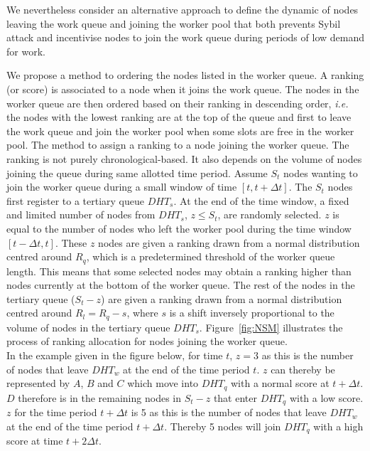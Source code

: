 \documentclass[a4paper, 12pt]{book}
\begin{document}
We nevertheless consider an alternative approach to define the dynamic of nodes leaving the work queue and joining the worker pool that both prevents Sybil attack and incentivise nodes to join the work queue during periods of low demand for work.

We propose a method to ordering the nodes listed in the worker queue. A ranking (or score) is associated to a node when it joins the work queue. The nodes in the worker queue are then ordered based on their ranking in descending order, \textit{i.e.} the nodes with the lowest ranking are at the top of the queue and first to leave the work queue and join the worker pool when some slots are free in the worker pool. The method to assign a ranking to a node joining the worker queue. 
The ranking is not purely chronological-based. It also depends on the volume of nodes joining the queue during same allotted time period. Assume $S_t$ nodes wanting to join the worker queue during a small window of time $[t, t+\Delta t]$. The $S_t$ nodes first register to a tertiary queue $DHT_s$. At the end of the time window, a fixed and limited number of nodes from $DHT_s$, $z \leq S_t$, are randomly selected. $z$ is equal to the number of nodes who left the worker pool during the time window  $[t-\Delta t, t]$. These $z$ nodes are given a ranking drawn from a normal distribution centred around $R_q$, which is a predetermined threshold of the worker queue length. This means that some selected nodes may obtain a ranking higher than nodes currently at the bottom of the worker queue. The rest of the nodes in the tertiary queue ($S_t-z$) are given a ranking drawn from a normal distribution centred around $R_l = R_q - s$, where $s$ is a shift inversely proportional to the volume of nodes in the tertiary queue $DHT_s$. Figure~\ref{fig:NSM} illustrates the process of ranking allocation for nodes joining the worker queue. \\

In the example given in the figure below, for time $t$, $z = 3$ as this is the number of nodes that leave $DHT_w$ at the end of the time period $t$. $z$ can thereby be represented by $A$, $B$ and $C$ which move into $DHT_q$ with a normal score at $t + \Delta t$. $D$ therefore is in the remaining nodes in $S_t - z$ that enter $DHT_q$ with a low score. $z$ for the time period $t + \Delta t$ is 5 as this is the number of nodes that leave $DHT_w$ at the end of the time period $t + \Delta t$. Thereby 5 nodes will join $DHT_q$ with a high score at time $t + 2\Delta t$.
\end{document}
